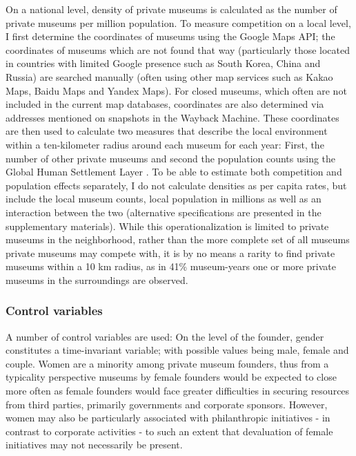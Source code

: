 \documentclass[12pt]{article}
\begin{document}
On a national level, density of private museums is calculated as the number of private museums per million population.
To measure competition on a local level, I first determine the coordinates of museums using the Google Maps API; the coordinates of museums which are not found that way (particularly those located in countries with limited Google presence such as South Korea, China and Russia) are searched manually (often using other map services such as Kakao Maps, Baidu Maps and Yandex Maps).
For closed museums, which often are not included in the current map databases, coordinates are also determined via addresses mentioned on snapshots in the Wayback Machine.
These coordinates are then used to calculate two measures that describe the local environment within a ten-kilometer radius around each museum for each year:
First, the number of other private museums and second the population counts using the Global Human Settlement Layer \parencite{EC_2023_GHSL}. 
To be able to estimate both competition and population effects separately, I do not calculate densities as per capita rates, but include the local museum counts, local population in millions as well as an interaction between the two (alternative specifications are presented in the supplementary materials).
While this operationalization is limited to private museums in the neighborhood, rather than the more complete set of all museums private museums may compete with, it is by no means a rarity to find private museums within a 10 km radius, as in 41\% museum-years one or more private museums in the surroundings are observed. 
\subsubsection*{Control variables}


\bigbreak
\noindent
A number of control variables are used: 
On the level of the founder, gender constitutes a time-invariant variable; with possible values being male, female and couple.
Women are a minority among private museum founders, thus from a typicality perspective \parencite{Rosch_1975_family} museums by female founders would be expected to close more often as female founders would face greater difficulties in securing resources from third parties, primarily governments and corporate sponsors.
However, women may also be particularly associated with philanthropic initiatives - in contrast to corporate activities \parencite{Milam_2013_artgirls} - to such an extent that devaluation of female initiatives may not necessarily be present.
\end{document}
